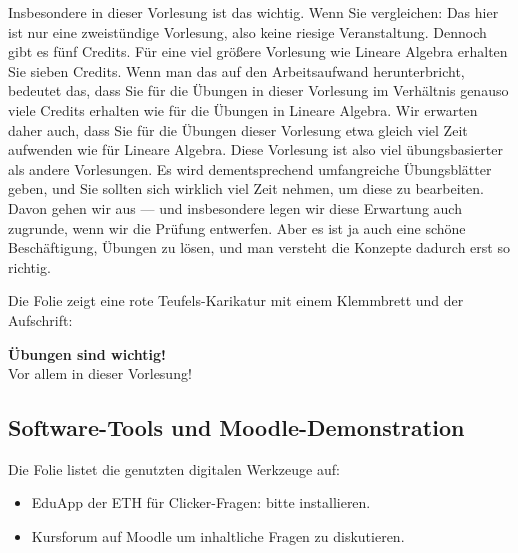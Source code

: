 \begin{spoken-clean}[00:07:08 - 00:09:43]
Insbesondere in dieser Vorlesung ist das wichtig. Wenn Sie vergleichen: Das hier ist nur eine zweistündige Vorlesung, also keine riesige Veranstaltung. Dennoch gibt es fünf Credits. Für eine viel größere Vorlesung wie Lineare Algebra erhalten Sie sieben Credits. Wenn man das auf den Arbeitsaufwand herunterbricht, bedeutet das, dass Sie für die Übungen in dieser Vorlesung im Verhältnis genauso viele Credits erhalten wie für die Übungen in Lineare Algebra. Wir erwarten daher auch, dass Sie für die Übungen dieser Vorlesung etwa gleich viel Zeit aufwenden wie für Lineare Algebra. Diese Vorlesung ist also viel übungsbasierter als andere Vorlesungen. Es wird dementsprechend umfangreiche Übungsblätter geben, und Sie sollten sich wirklich viel Zeit nehmen, um diese zu bearbeiten. Davon gehen wir aus --- und insbesondere legen wir diese Erwartung auch zugrunde, wenn wir die Prüfung entwerfen. Aber es ist ja auch eine schöne Beschäftigung, Übungen zu lösen, und man versteht die Konzepte dadurch erst so richtig.
\end{spoken-clean}

\begin{ai-global-state-checkpoint-invisible-content}
\end{ai-global-state-checkpoint-invisible-content}

\begin{meta-note}
Die Folie zeigt eine rote Teufels-Karikatur mit einem Klemmbrett und der Aufschrift:
\begin{center}
\textbf{Übungen sind wichtig!} \\
Vor allem in dieser Vorlesung!
\end{center}
\end{meta-note}

\subsection{Software-Tools und Moodle-Demonstration}

\begin{meta-note}
Die Folie listet die genutzten digitalen Werkzeuge auf:
\begin{itemize}
    \item EduApp der ETH für Clicker-Fragen: bitte installieren.
    \item Kursforum auf Moodle um inhaltliche Fragen zu diskutieren.
\end{itemize}
\end{meta-note}

